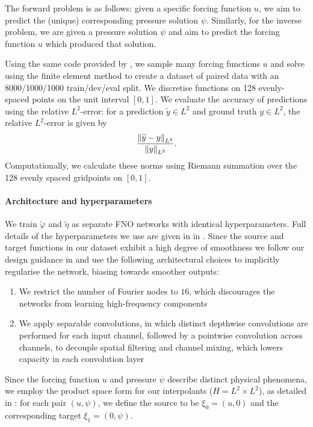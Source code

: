 The forward problem is as follows: given a specific forcing function \(u\), we aim to predict the (unique) corresponding pressure solution \(\psi\). Similarly, for the inverse problem, we are given a pressure solution \(\psi\) and aim to predict the forcing function \(u\) which produced that solution.

Using the same code provided by \citep{bahmani2025resolution}, we sample many forcing functions \(u\) and solve  using the finite element method to create a dataset of paired data with an 8000/1000/1000 train/dev/eval split. We discretise functions on 128 evenly-spaced points on the unit interval \([0, 1]\). We evaluate the accuracy of predictions using the relative \(L^{2}\)-error: for a prediction \(\widetilde{y} \in L^{2}\) and ground truth \(y \in L^{2}\), the relative \(L^{2}\)-error is given by
\[
  \frac{\norm{ \widetilde{y} - y}_{L^{2}}}{\norm{y}_{L^{2}}}.
\]
Computationally, we calculate these norms using Riemann summation over the 128 evenly spaced gridpoints on \([0, 1]\).

\paragraph{Architecture and hyperparameters}
We train \(\widetilde{\varphi}\) and \(\widetilde{\eta}\) as separate FNO networks with identical hyperparameters. Full details of the hyperparameters we use are given in  in . Since the source and target functions in our dataset exhibit a high degree of smoothness we follow our design guidance in  and use the following architectural choices to implicitly regularise the network, biasing towards smoother outputs:
\begin{enumerate}
  \item We restrict the number of Fourier nodes to \(16\), which discourages the networks from learning high-frequency components
  \item We apply separable convolutions, in which distinct depthwise convolutions are performed for each input channel, followed by a pointwise convolution across channels, to decouple spatial filtering and channel mixing, which lowers capacity in each convolution layer
\end{enumerate}

Since the forcing function \(u\) and pressure \(\psi\) describe distinct physical phenomena, we employ the product space form for our interpolants (\(H = L^{2} \times L^{2}\)), as detailed in : for each pair \((u, \psi)\), we define the source to be \(\xi_{0} = (u, 0)\) and the corresponding target \(\xi_{1} = (0, \psi)\).

